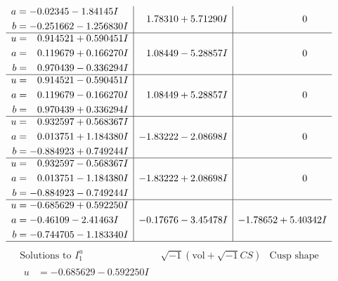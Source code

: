 \documentclass[1p]{elsarticle_modified}
\theoremstyle{definition}
\newcommand{\I}{\sqrt{-1}}
\begin{document}
$$\begin{array}{c|c|c}
\begin{aligned}
a &= -0.02345 - 1.84145 I \\
b &= -0.251662 - 1.256830 I\end{aligned}
 & \phantom{-}1.78310 + 5.71290 I & \phantom{-0.000000 } 0 \\ \hline\begin{aligned}
u &= \phantom{-}0.914521 + 0.590451 I \\
a &= \phantom{-}0.119679 + 0.166270 I \\
b &= \phantom{-}0.970439 - 0.336294 I\end{aligned}
 & \phantom{-}1.08449 - 5.28857 I & \phantom{-0.000000 } 0 \\ \hline\begin{aligned}
u &= \phantom{-}0.914521 - 0.590451 I \\
a &= \phantom{-}0.119679 - 0.166270 I \\
b &= \phantom{-}0.970439 + 0.336294 I\end{aligned}
 & \phantom{-}1.08449 + 5.28857 I & \phantom{-0.000000 } 0 \\ \hline\begin{aligned}
u &= \phantom{-}0.932597 + 0.568367 I \\
a &= \phantom{-}0.013751 + 1.184380 I \\
b &= -0.884923 + 0.749244 I\end{aligned}
 & -1.83222 - 2.08698 I & \phantom{-0.000000 } 0 \\ \hline\begin{aligned}
u &= \phantom{-}0.932597 - 0.568367 I \\
a &= \phantom{-}0.013751 - 1.184380 I \\
b &= -0.884923 - 0.749244 I\end{aligned}
 & -1.83222 + 2.08698 I & \phantom{-0.000000 } 0 \\ \hline\begin{aligned}
u &= -0.685629 + 0.592250 I \\
a &= -0.46109 - 2.41463 I \\
b &= -0.744705 - 1.183340 I\end{aligned}
 & -0.17676 - 3.45478 I & -1.78652 + 5.40342 I\\
 \hline 
 \end{array}$$\newpage$$\begin{array}{c|c|c}  
\text{Solutions to }I^u_{1}& \I (\text{vol} + \sqrt{-1}CS) & \text{Cusp shape}\\
 \hline 
\begin{aligned}
u &= -0.685629 - 0.592250 I \\

\end{aligned}
\end{array}$$
\end{document}
